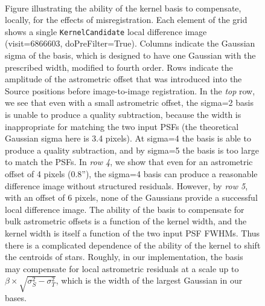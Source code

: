 \documentclass[prd, nofootinbib, floatfix, 11pt,tightenlines,times]{article}
\begin{document}
\begin{figure}
 \\
\caption{Figure illustrating the ability of the kernel basis to
  compensate, locally, for the effects of misregistration.  Each
  element of the grid shows a single {\tt KernelCandidate} local
  difference image (visit=6866603, doPreFilter=True).  Columns
  indicate the Gaussian sigma of the basis, which is designed to have
  one Gaussian with the prescribed width, modified to fourth order.
  Rows indicate the amplitude of the astrometric offset that was
  introduced into the Source positions before image-to-image
  registration.  In the {\it top} row, we see that even with a small
  astrometric offset, the sigma=2 basis is unable to produce a quality
  subtraction, because the width is inappropriate for matching the two
  input PSFs (the theoretical Gaussian sigma here is 3.4 pixels).  At
  sigma=4 the basis is able to produce a quality subtraction, and by
  sigma=5 the basis is too large to match the PSFs.  In {\it row 4},
  we show that even for an astrometric offset of 4 pixels (0.8''), the
  sigma=4 basis can produce a reasonable difference image without
  structured residuals.  However, by {\it row 5}, with an offset of 6
  pixels, none of the Gaussians provide a successful local difference
  image.  The ability of the basis to compensate for bulk astrometric
  offsets is a function of the kernel width, and the kernel width is
  itself a function of the two input PSF FWHMs.  Thus there is a
  complicated dependence of the ability of the kernel to shift the
  centroids of stars.  Roughly, in our implementation, the basis may
  compensate for local astrometric residuals at a scale up to $\beta
  \times \sqrt{\sigma_S^2 - \sigma_T^2}$, which is the width of the
  largest Gaussian in our bases.}
\label{kernel_offsets}
\end{figure}
\end{document}

